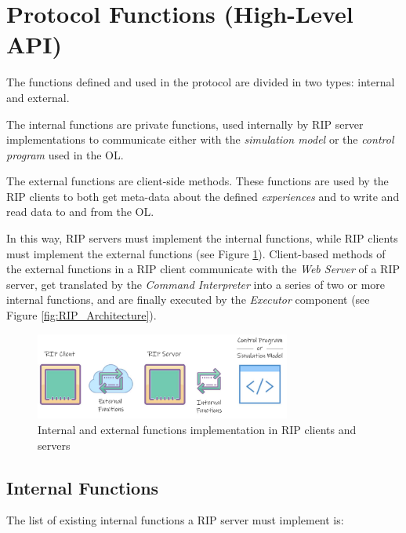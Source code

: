 \section{Protocol Functions (High-Level API)}
The functions defined and used in the protocol are divided in two types: internal and external.

The internal functions are private functions, used internally by RIP server implementations to communicate either with the \textit{simulation model} or the \textit{control program} used in the OL.

The external functions are client-side methods. These functions are used by the RIP clients to both get meta-data about the defined \textit{experiences} and to write and read data to and from the OL.

In this way, RIP servers must implement the internal functions, while RIP clients must implement the external functions (see Figure \ref{fig:Functions_Implementation}). Client-based methods of the external functions in a RIP client communicate with the \textit{Web Server} of a RIP server, get translated by the \textit{Command Interpreter} into a series of two or more internal functions, and are finally executed by the \textit{Executor} component (see Figure \ref{fig:RIP_Architecture}).

\begin{figure}
\centering
\includegraphics[width=0.75\textwidth]{images/FunctionsImplementation.pdf}
\caption{Internal and external functions implementation in RIP clients and servers}
\label{fig:Functions_Implementation}
\end{figure}

\subsection{Internal Functions}
\label{sec:Internal_Functions}
The list of existing internal functions a RIP server must implement is:


